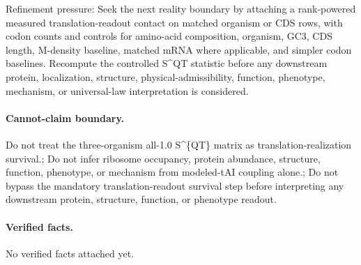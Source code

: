 Refinement pressure: Seek the next reality boundary by attaching a rank-powered measured translation-readout contact on matched organism or CDS rows, with codon counts and controls for amino-acid composition, organism, GC3, CDS length, M-density baseline, matched mRNA where applicable, and simpler codon baselines. Recompute the controlled S\textasciicircum{}QT statistic before any downstream protein, localization, structure, physical-admissibility, function, phenotype, mechanism, or universal-law interpretation is considered.

\paragraph{Cannot-claim boundary.} Do not treat the three-organism all-1.0 S\textasciicircum{}\{QT\} matrix as translation-realization survival.; Do not infer ribosome occupancy, protein abundance, structure, function, phenotype, or mechanism from modeled-tAI coupling alone.; Do not bypass the mandatory translation-readout survival step before interpreting any downstream protein, structure, function, or phenotype readout.

\paragraph{Verified facts.}
No verified facts attached yet.
